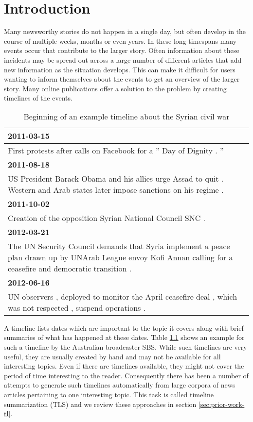 \documentclass[a4paper,BCOR=10mm]{report}
\numberwithin{lemma}{chapter}
\numberwithin{definition}{chapter}
\begin{document}


\chapter{Introduction}

Many newsworthy stories do not happen in a single day, but often develop in the course of multiple weeks, months or even years. In these long timespans many events occur that contribute to the larger story. Often information about these incidents may be spread out across a large number of different articles that add new information as the situation develops. This can make it difficult for users wanting to inform themselves about the events to get an overview of the larger story. Many online publications offer a solution to the problem by creating timelines of the events.

\begin{table}
\begin{tabularx}{\textwidth}{|X|}
\hline
\textbf{2011-03-15} \\\hline
First protests after calls on Facebook for a '' Day of Dignity . '' \\\hline
\textbf{2011-08-18} \\\hline
US President Barack Obama and his allies urge Assad to quit . \newline Western and Arab states later impose sanctions on his regime . \\\hline
\textbf{2011-10-02} \\\hline
Creation of the opposition Syrian National Council SNC . \\\hline
\textbf{2012-03-21} \\\hline
The UN Security Council demands that Syria implement a peace plan drawn up by UNArab League envoy Kofi Annan calling for a ceasefire and democratic transition . \\\hline
\textbf{2012-06-16} \\\hline
UN observers , deployed to monitor the April ceasefire deal , which was not respected , suspend operations . \\\hline
\end{tabularx}
\caption{Beginning of an example timeline about the Syrian civil war}
\label{tab:example-tl}
\end{table}

A timeline lists dates which are important to the topic it covers along with brief summaries of what has happened at these dates. Table \ref{tab:example-tl} shows an example for such a timeline by the Australian broadcaster SBS.
While such timelines are very useful, they are usually created by hand and may not be available for all interesting topics. Even if there are timelines available, they might not cover the period of time interesting to the reader.
Consequently there has been a number of attempts to generate such timelines automatically from large corpora of news articles pertaining to one interesting topic. This task is called timeline summarization (TLS) and we review these approaches in section \ref{sec:prior-work-tl}.
\end{document}

